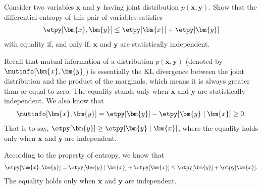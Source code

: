 \begin{question}{1.31}
	Consider two variables $\bm{x}$ and $\bm{y}$ having joint distribution $p(\bm{x}, \bm{y})$. Show that the differential entropy of this pair of variables satisfies
	\begin{align}
		\etpy[\bm{x}, \bm{y}] \leq \etpy[\bm{x}] + \etpy[\bm{y}]
	\end{align}
	with equality if, and only if, $\bm{x}$ and $\bm{y}$ are statistically independent.
\end{question}

\begin{answer}{}
	Recall that mutual information of a distribution $p(\bm{x}, \bm{y})$ (denoted by $\mutinfo [\bm{x}, \bm{y}]$) is essentially the KL divergence between the joint distribution and the product of the marginals, which means it is always greater than or equal to zero. The equality stands only when $\bm{x}$ and $\bm{y}$ are statistically independent. We also know that
	\begin{align}
		\mutinfo[\bm{x}, \bm{y}] = \etpy[\bm{y}] - \etpy[\bm{y} \mid \bm{x}] \geq 0.
	\end{align}
	That is to say, $\etpy[\bm{y}]\geq \etpy[\bm{y} \mid \bm{x}]$, where the equality holds only when $\bm{x}$ and $\bm{y}$ are independent.
	
	According to the property of entropy, we know that
	\begin{align}
		\etpy[\bm{x}, \bm{y}] = \etpy[\bm{y} \mid \bm{x}] + \etpy[\bm{x}] \leq \etpy[\bm{y}] + \etpy[\bm{x}].
	\end{align}
	The equality holds only when $\bm{x}$ and $\bm{y}$ are independent.
\end{answer}